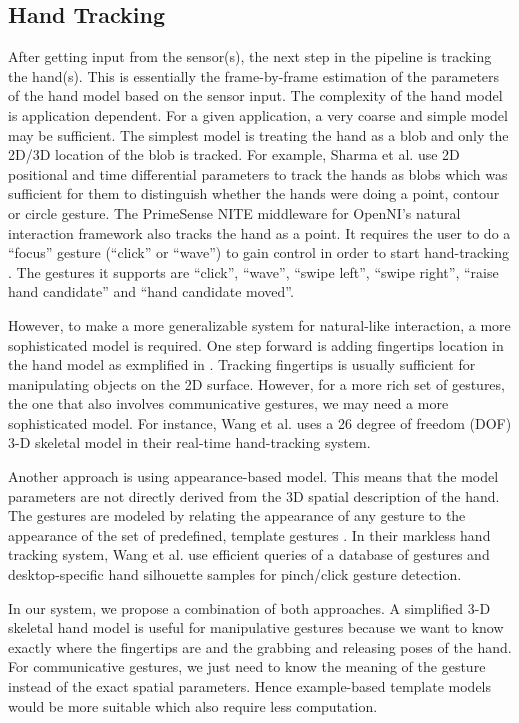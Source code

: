 \subsection{Hand Tracking}
After getting input from the sensor(s), the next step in the pipeline is
tracking the hand(s). This is essentially the frame-by-frame estimation of the
parameters of the hand model based on the sensor input. The complexity of the
hand model is application dependent. For a given application, a very coarse and
simple model may be sufficient. The simplest model is treating the hand as a
blob and only the 2D/3D location of the blob is tracked. For example, Sharma et
al. \cite{sharma00} use 2D positional and time differential parameters to track
the hands as blobs which was sufficient for them to distinguish whether the
hands were doing a point, contour or circle gesture. The PrimeSense NITE
middleware for OpenNI's natural interaction framework also tracks the hand as a
point. It requires the user to do a ``focus'' gesture (``click'' or ``wave'')
to gain control in order to start hand-tracking \cite{primesense-manual}. The
gestures it supports are ``click'', ``wave'', ``swipe left'', ``swipe right'', 
``raise hand candidate'' and ``hand candidate moved''.

However, to make a more generalizable system for natural-like interaction, a
more sophisticated model is required. One step forward is adding fingertips
location in the hand model as exmplified in \cite{Oka02} \cite{harrison11}
\cite{larson11}. Tracking fingertips is usually sufficient for manipulating
objects on the 2D surface. However, for a more rich set of gestures, the one
that also involves communicative gestures, we may need a more sophisticated
model. For instance, Wang et al. \cite{Wang09} uses a 26 degree of freedom (DOF)
3-D skeletal model in their real-time hand-tracking system. 

Another approach is using appearance-based model. This means that the model
parameters are not directly derived from the 3D spatial description of the hand.
The gestures are modeled by relating the appearance of any gesture to the 
appearance of the set of predefined, template gestures \cite{Pavlovic97}. In
their markless hand tracking system, Wang et al. \cite{wang11} use efficient
queries of a database of gestures and desktop-specific hand silhouette samples
for pinch/click gesture detection.

In our system, we propose a combination of both approaches. A simplified 3-D
skeletal hand model is useful for manipulative gestures because we want to know 
exactly where the fingertips are and the grabbing and releasing poses of the hand. For
communicative gestures, we just need to know the meaning of the gesture instead
of the exact spatial parameters. Hence example-based template models would be
more suitable which also require less computation.

